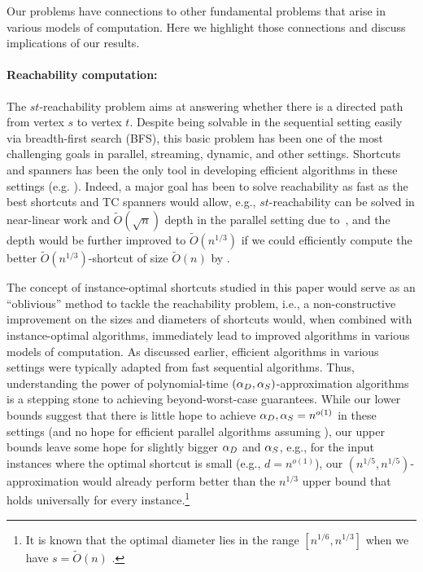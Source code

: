 Our problems have  connections to other fundamental problems that arise in various models of computation. Here we highlight those connections and discuss implications of our results. 



\paragraph{Reachability computation:} The $st$-reachability problem aims at answering whether there is a directed path from vertex $s$ to vertex $t$. Despite being solvable in the sequential setting easily via breadth-first search (BFS), this basic problem has been one of the most challenging goals in parallel, streaming, dynamic, and other settings. Shortcuts and spanners has been the only tool in developing efficient algorithms in these settings  (e.g. \cite{KleinS97,HenzingerKN14,HenzingerKN15,ForsterN18,LiuJS19,Fineman18,GutenbergW20,BernsteinGW20,CaoFR20,CaoFR21,KarczmarzS21}). 
Indeed, a major goal has been to solve reachability as fast as the best shortcuts and TC spanners would allow, e.g., $st$-reachability can be solved in near-linear work and $\tilde O(\sqrt{n})$ depth in the parallel setting due to~\cite{LiuJS19}, and the depth would be further improved to $\tilde O(n^{1/3})$ if we could efficiently compute the better $\tilde O(n^{1/3})$-shortcut of size $\tilde O(n)$ by \cite{KoganP22}. 

The concept of instance-optimal shortcuts studied in this paper would serve as an ``oblivious'' method to tackle the reachability problem, i.e., a non-constructive improvement on the sizes and diameters of shortcuts  would, when combined with instance-optimal algorithms, immediately lead to improved algorithms in various models of computation. As discussed earlier, efficient algorithms in various settings were typically adapted from fast sequential algorithms. Thus, understanding the power of polynomial-time $(\alpha_D,\alpha_S)$-approximation algorithms is a stepping stone to achieving beyond-worst-case guarantees.
While our lower bounds suggest that there is little hope to achieve $\alpha_D,\alpha_S=n^{o(1)}$ in these settings (and no hope for efficient parallel algorithms assuming \conj{}), our upper bounds leave some hope for slightly bigger $\alpha_D$ and $\alpha_S$, e.g., for the input instances where the optimal shortcut is small (e.g., $d=n^{o(1)}$), our $(n^{1/5}, n^{1/5})$-approximation would already perform better than the $n^{1/3}$ upper bound that holds universally for every instance.\footnote{It is known that the optimal diameter lies in the range $[n^{1/6}, n^{1/3}]$ when we have $s=\tilde{O}(n)$ \cite{KoganP22, Hesse03, HuangP21}.} 



